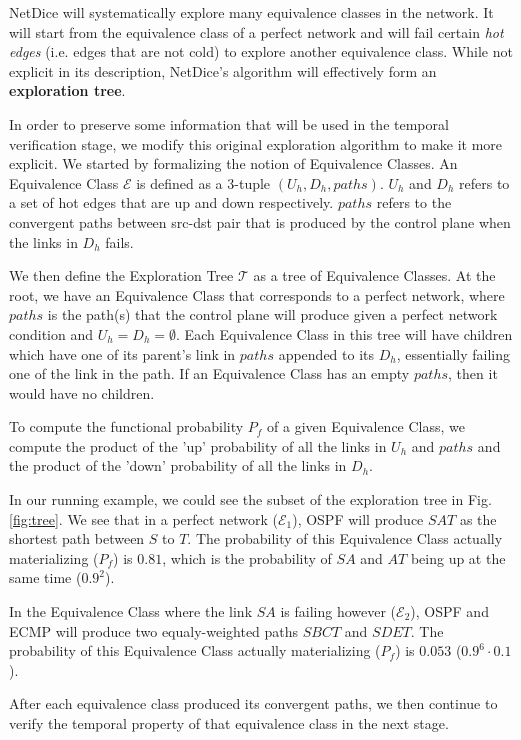 NetDice will systematically explore many equivalence classes in the network. 
It will start from the equivalence class of a perfect network and will fail certain 
\textit{hot edges} (i.e. edges that are not cold) to explore another equivalence 
class.
While not explicit in its description, NetDice's algorithm will effectively form an 
\textbf{exploration tree}. 

In order to preserve some information that will be used in the temporal verification 
stage, we modify this original exploration algorithm to make it more explicit.
We started by formalizing the notion of Equivalence Classes.
An Equivalence Class $\mathcal{E}$ is defined as a 3-tuple $(U_h, D_h, paths)$.
$U_h$ and $D_h$ refers to a set of hot edges that are up and down respectively.
$paths$ refers to the convergent paths between src-dst pair that is produced by the
control plane when the links in $D_h$ fails.

We then define the Exploration Tree $\mathcal{T}$ as a tree of Equivalence Classes.
At the root, we have an Equivalence Class that corresponds to a perfect network, where 
$paths$ is the path(s) that the control plane will produce given a perfect network 
condition and $U_h = D_h = \emptyset$.
Each Equivalence Class in this tree will have children which have one of its parent's link in 
$paths$ appended to its $D_h$, essentially failing one of the link in the path.
If an Equivalence Class has an empty $paths$, then it would have no children.

To compute the functional probability $P_f$ of a given Equivalence Class, we compute the 
product of the 'up' probability of all the links in $U_h$ and $paths$ and the 
product of the 'down' probability of all the links in $D_h$.

In our running example, we could see the subset of the exploration tree in Fig. 
\ref{fig:tree}. 
We see that in a perfect network ($\mathcal{E}_1$), OSPF will produce $SAT$ as the 
shortest path between $S$ to $T$.  
The probability of this Equivalence Class actually materializing ($P_f$) is $0.81$, 
which is the probability of $SA$ and $AT$ being up at the same time ($0.9^2$).

In the Equivalence Class where the link $SA$ is failing however ($\mathcal{E}_2$), 
OSPF and ECMP will produce two equaly-weighted paths $SBCT$ and $SDET$.
The probability of this Equivalence Class actually materializing ($P_f$) is $0.053$
($0.9^6 \cdot 0.1$).

After each equivalence class produced its convergent paths, we then continue to verify the 
temporal property of that equivalence class in the next stage.